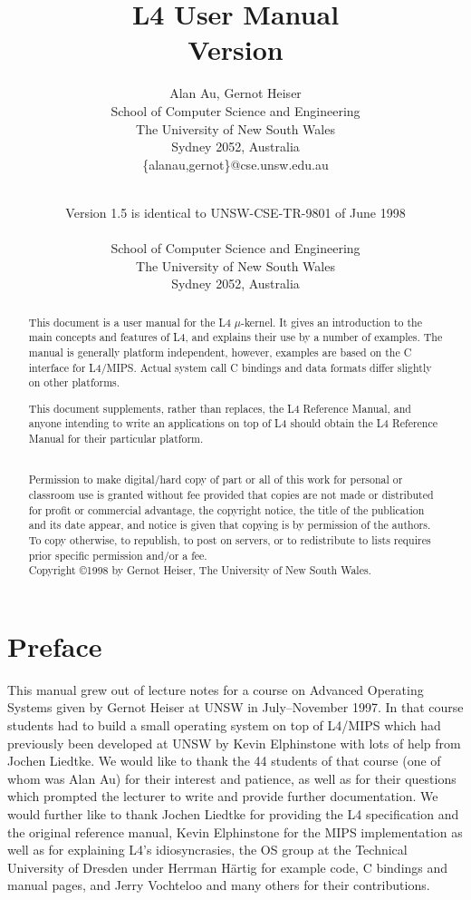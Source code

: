 \documentclass[a4paper,11pt,twoside,dvips]{report}
\title{\Huge L4 User Manual\\[20pt]
       \LARGE Version \RCSRevision}
\author{Alan Au, Gernot Heiser\\
       {\normalsize School of Computer Science and Engineering}\\
       {\normalsize The University of New South Wales}\\
       {\normalsize Sydney 2052, Australia}\\
       {\normalsize \{alanau,gernot\}@cse.unsw.edu.au}}
\date{\RCSDate\\[1ex] Version 1.5 is identical to UNSW-CSE-TR-9801 of June 1998\\
	\vfill\sf
	\epsfig{file=eps/unicrest-screen.eps,height=25mm}\\[2ex]
	School of Computer Science and Engineering\\
	The University of New South Wales\\
	Sydney 2052, Australia \vspace{-10mm}}
\newcounter{example}[chapter]
\newcommand{\micro}{$\mu$}
\begin{document}
\thispagestyle{empty}
\setcounter{page}{1}


\maketitle

\setcounter{page}{2}
\pagestyle{headings}
\thispagestyle{empty}

\cleardoublepage

\begin{abstract}
\thispagestyle{headings} \setcounter{page}{3} This document is a user
manual for the L4 \micro-kernel. It gives an introduction to the main
concepts and features of L4, and explains their use by a number of
examples. The manual is generally platform independent, however,
examples are based on the C interface for L4/MIPS. Actual system call C
bindings and data formats differ slightly on other platforms.

This document supplements, rather than replaces, the L4 Reference
Manual, and anyone intending to write an applications on top of L4
should obtain the L4 Reference Manual for their particular platform.

\vspace*{\fill}
{\small
\noindent\hrulefill\\
%
Permission to make digital/hard copy of part or all of this work for
personal or classroom use is granted without fee provided that copies
are not made or distributed for profit or commercial advantage, the
copyright notice, the title of the publication and its date appear, and
notice is given that copying is by permission of the authors. To copy
otherwise, to republish, to post on servers, or to redistribute to lists
requires prior specific permission and/or a fee.\\[2ex]
%
Copyright \copyright 1998 by Gernot Heiser, The University of New South Wales.
}
\end{abstract}
\clearpage
\setcounter{page}{4}
\cleardoublepage

\setcounter{page}{5}
\section*{Preface}

This manual grew out of lecture notes for a course on Advanced Operating
Systems given by Gernot Heiser at UNSW in July--November 1997. In that
course students had to build a small operating system on top of L4/MIPS
which had previously been developed at UNSW by Kevin Elphinstone with
lots of help from Jochen Liedtke. We would like to thank the 44 students
of that course (one of whom was Alan Au) for their interest and
patience, as well as for their questions which prompted the lecturer to
write and provide further documentation. We would further like to thank
Jochen Liedtke for providing the L4 specification and the original
reference manual, Kevin Elphinstone for the MIPS implementation as well
as for explaining L4's idiosyncrasies, the OS group at the Technical
University of Dresden under Herrman H\"artig for example code, C
bindings and manual pages, and Jerry Vochteloo and many others for their
contributions.
\end{document}
